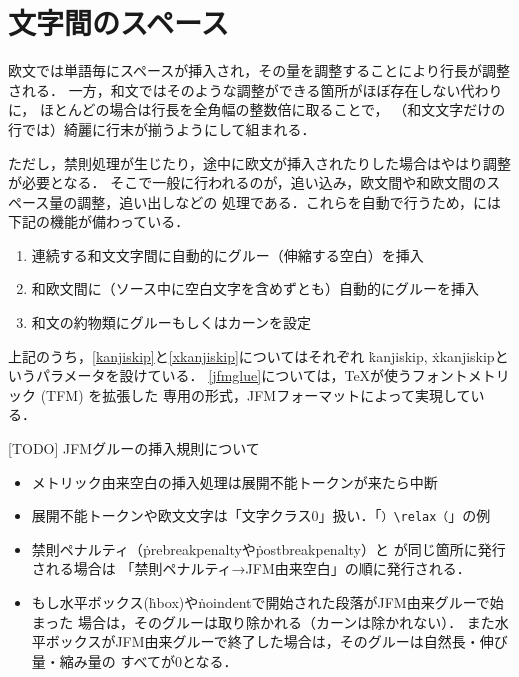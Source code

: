 \documentclass[a4paper,11pt,nomag,dvipdfmx]{jsarticle}
\begin{document}
\section{文字間のスペース}

欧文では単語毎にスペースが挿入され，その量を調整することにより行長が調整される．
一方，和文ではそのような調整ができる箇所がほぼ存在しない代わりに，
ほとんどの場合は行長を全角幅の整数倍に取ることで，
（和文文字だけの行では）綺麗に行末が揃うようにして組まれる．

ただし，禁則処理が生じたり，途中に欧文が挿入されたりした場合はやはり調整が必要となる．
そこで一般に行われるのが，追い込み，欧文間や和欧文間のスペース量の調整，追い出しなどの
処理である．これらを自動で行うため，\pTeX には下記の機能が備わっている．
\begin{enumerate}
\item 連続する和文文字間に自動的にグルー（伸縮する空白）を挿入\label{kanjiskip}
\item 和欧文間に（ソース中に空白文字を含めずとも）自動的にグルーを挿入\label{xkanjiskip}
\item 和文の約物類にグルーもしくはカーンを設定\label{jfmglue}
\end{enumerate}
上記のうち，\ref{kanjiskip}と\ref{xkanjiskip}についてはそれぞれ
\.{kanjiskip}, \.{xkanjiskip}というパラメータを設けている．
\ref{jfmglue}については，\TeX が使うフォントメトリック (TFM) を拡張した
\pTeX 専用の形式，JFMフォーマットによって実現している．

[TODO] JFMグルーの挿入規則について
\begin{itemize}
 \item メトリック由来空白の挿入処理は展開不能トークンが来たら中断
 \item 展開不能トークンや欧文文字は「文字クラス0」扱い．「\verb+）\relax（+」の例
 \item 禁則ペナルティ（\.{prebreakpenalty}や\.{postbreakpenalty}）と
  が同じ箇所に発行される場合は
  「禁則ペナルティ→JFM由来空白」の順に発行される．
\iffalse %
 \item より一般に，禁則ペナルティ，JFM由来空白，ベースライン補正，
  欧文TFM由来カーンが同じ箇所に発行される場合は
  次の順になる（\ref{sec:kinsoku}節の注意の一般化）．%
  \begin{itemize}
   \item 和文→欧文：禁則ペナルティ→JFM由来空白→ベースライン補正→%
   欧文TFM由来カーン
   \item 欧文→和文：ベースライン補正→禁則ペナルティ→JFM由来空白
   \footnote{[TODO] \TeX~Live~2019の\pTeX~3.8.2では，欧文TFM由来カーンは欧文→和文の
   切替時には挿入されない．}%
  \end{itemize}
\fi %
 \item もし水平ボックス(\.{hbox})や\.{noindent}で開始された段落がJFM由来グルーで始まった
   場合は，そのグルーは取り除かれる（カーンは除かれない）．
   また水平ボックスがJFM由来グルーで終了した場合は，そのグルーは自然長・伸び量・縮み量の
   すべてが0となる．
\end{itemize}
\end{document}
